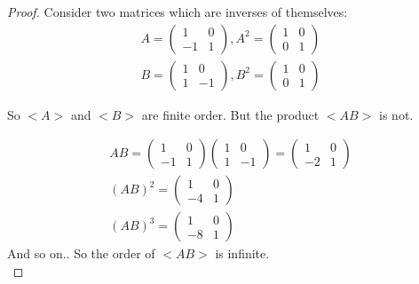 \documentclass[12pt,leqno]{article}
\numberwithin{equation}{section}
\theoremstyle{definition}
\begin{document}
\begin{proof}[Proof]

    Consider two matrices which are inverses of themselves:
    \begin{align*}
        A = 
         \left( 
        \begin{array}{cc}
            1 & 0 \\
           -1 & 1
        \end{array} \right)
         , A^2 = 
        \left( 
        \begin{array}{cc}
            1 & 0 \\
            0 & 1
        \end{array} \right) \\
        B = 
         \left( 
        \begin{array}{cc}
            1 & 0 \\
            1 & -1
        \end{array} \right)
         , B^2 = 
        \left( 
        \begin{array}{cc}
            1 & 0 \\
            0 & 1
        \end{array} \right)
    \end{align*}

    So $<A>$ and $<B>$ are finite order. But the product $<AB>$ is not.

    \begin{align*}
        AB = 
         \left( 
        \begin{array}{cc}
            1 & 0 \\
           -1 & 1
        \end{array} \right)
        \left( 
        \begin{array}{cc}
            1 & 0 \\
            1 & -1
        \end{array} \right)
        = 
        \left( 
        \begin{array}{cc}
            1 & 0 \\
           -2 & 1
        \end{array} \right) \\
        (AB)^2 =
        \left( 
        \begin{array}{cc}
            1 & 0 \\
           -4 & 1
        \end{array} \right) \\
        (AB)^3 =
        \left( 
        \begin{array}{cc}
            1 & 0 \\
           -8 & 1
        \end{array} \right)
    \end{align*}
    And so on.. So the order of $<AB>$ is infinite. \\


\end{proof}
\end{document}
